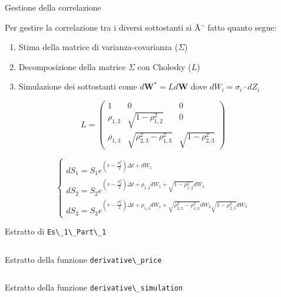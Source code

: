 \begin{frame}{Gestione della correlazione}
\begin{block}

Per gestire la correlazione tra i diversi sottostanti si Ã¨ fatto quanto segue:
\begin{enumerate}

\item Stima della matrice di varianza-covarianza ($\Sigma$)
\item Decomposizione della matrice $\Sigma$ con Cholesky ($L$)
\item Simulazione dei sottostanti come $ d\textbf{W}^{*} = Ld\textbf{W} $ dove $dW_i= \sigma_i \cdot dZ_i$
\end{enumerate}

$$
L=
\begin{pmatrix} 1 & 0 & 0 \\  
\rho_{1,2} & \sqrt{1 - \rho^2_{1,2}} & 0 \\ 
\rho_{1,3} & \sqrt{\rho^2_{2,3} - \rho^2_{1,3}} &\sqrt{1 - \rho^2_{2,3}} \end{pmatrix}
$$

$$ 
\begin{cases} dS_{1} = S_{1} e^{(r - \frac{\sigma_{1}^2}{2})\Delta t + dW_{1}} \\ 
dS_{2} = S_{2} e^{(r - \frac{\sigma_{2}^2}{2})\Delta t + \rho_{1,2}dW_{1} + \sqrt{1 - \rho^2_{1,2}} dW_{2}}  \\ 
dS_{3} = S_{3} e^{(r - \frac{\sigma_{3}^2}{2})\Delta t + \rho_{1,3}dW_{1} + \sqrt{\rho^2_{2,3} - \rho^2_{1,3}} dW_{3} \sqrt{1 - \rho^2_{2,3}} dW_{3}}  
\end{cases}
$$

\end{block}
\end{frame}





\begin{frame}{Estratto di \color{black}\Verb+Es\_1\_Part\_1+}
	\inputminted[fontsize=\tiny]{vb.net}{images/99_old_misuraca_trash/assets/part1.txt}
\end{frame} 

\begin{frame}{Estratto della funzione \color{black}\Verb+derivative\_price+}
	\inputminted[fontsize=\tiny]{vb.net}{images/99_old_misuraca_trash/assets/derivative_price.txt}
\end{frame}

\begin{frame}{Estratto della funzione \color{black}\Verb+derivative\_simulation+}
	\inputminted[fontsize=\tiny]{vb.net}{images/99_old_misuraca_trash/assets/derivative_simulation.txt}
\end{frame}

